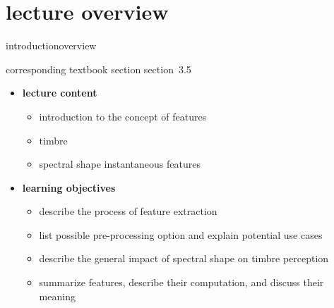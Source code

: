     \section[overview]{lecture overview}
        \begin{frame}{introduction}{overview}
            \begin{block}{corresponding textbook section}
                    section~3.5
            \end{block}

            \begin{itemize}
                \item   \textbf{lecture content}
                    \begin{itemize}
                        \item   introduction to the concept of features
                        \item   timbre
                        \item   spectral shape instantaneous features
                   \end{itemize}
                \bigskip
                \item<2->   \textbf{learning objectives}
                    \begin{itemize}
                        \item   describe the process of feature extraction
                        \item   list possible pre-processing option and explain potential use cases
                        \item   describe the general impact of spectral shape on timbre perception
                        \item   summarize features, describe their computation, and discuss their meaning
                    \end{itemize}
            \end{itemize}
        \end{frame}

